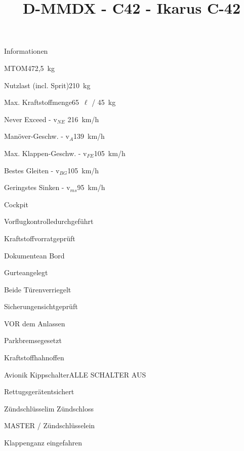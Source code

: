 \def\papersize{4}




\title{D-MMDX  -  C42  -  Ikarus C-42}

\begin{checklist}{Informationen}
 	\item{MTOM}{472,5~kg}
  	\item{Nutzlast (incl. Sprit)}{210~kg}
  	\item{Max. Kraftstoffmenge}{65~${\ell}$ / 45~kg}
 	  \item{Never Exceed  -  v$_{NE}$ }{216~km/h}
	  \item{Manöver-Geschw.  -  v$_{A}$}{139~km/h}
	  \item{Max. Klappen-Geschw.  -  v$_{FE}$}{105~km/h}
	  \item{Bestes Gleiten  -  v$_{BG}$}{105~km/h}
	  \item{Geringstes Sinken  -  v$_{ms}$}{95~km/h}
\end{checklist}

\begin{checklist}{Cockpit}
	\item{Vorflugkontrolle}{durchgeführt}
	\item{Kraftstoffvorrat}{geprüft}
	\item{Dokumente}{an Bord}
	\item{Gurte}{angelegt}
	\item{Beide Türen}{verriegelt}
	\item{Sicherungen}{sichtgeprüft}
\end{checklist}

\begin{checklist}{VOR dem Anlassen}
	\item{Parkbremse}{gesetzt}
	\item{Kraftstoffhahn}{offen}
	\item{Avionik Kippschalter}{ALLE SCHALTER AUS}
	\item{Rettugsgerät}{entsichert}
	\item{Zündschlüssel}{im Zündschloss}
	\item{MASTER / Zündschlüssel}{ein}
	\item{Klappen}{ganz eingefahren}
\end{checklist}

